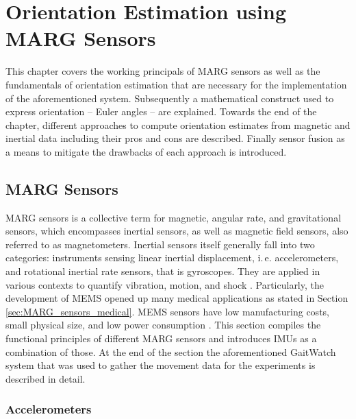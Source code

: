 \chapter{Orientation Estimation using MARG Sensors}
\label{ch:orientation_estimation}

This chapter covers the working principals of MARG sensors as well as the fundamentals of orientation estimation that are necessary for the implementation of the aforementioned system. Subsequently a mathematical construct used to express orientation -- Euler angles -- are explained. Towards the end of the chapter, different approaches to compute orientation estimates from magnetic and inertial data including their pros and cons are described. Finally sensor fusion as a means to mitigate the drawbacks of each approach is introduced.

\section{MARG Sensors}

MARG sensors is a collective term for magnetic, angular rate, and gravitational sensors, which encompasses inertial sensors, as well as magnetic field sensors, also referred to as magnetometers. Inertial sensors itself generally fall into two categories: instruments sensing linear inertial displacement, i.\,e. accelerometers, and rotational inertial rate sensors, that is gyroscopes. They are applied in various contexts to quantify vibration, motion, and shock \cite{bhattacharyya_inertial_sensors_applications_13}. Particularly, the development of \gls{MEMS} opened up many medical applications as stated in Section \ref{sec:MARG_sensors_medical}. MEMS sensors have low manufacturing costs, small physical size, and low power consumption \cite{bhattacharyya_inertial_sensors_applications_13}. This section compiles the functional principles of different MARG sensors and introduces \glspl{IMU} as a combination of those. At the end of the section the aforementioned GaitWatch system that was used to gather the movement data for the experiments is described in detail.

\subsection{Accelerometers}\label{sec:accelerometers}

